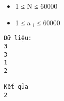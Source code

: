 \begin{itemize}
	\item     1 ≤ N ≤ 60000   
	\item     1 ≤ a    $_     i    $    ≤ 60000   
\end{itemize}
\begin{verbatim}
Dữ liệu:
3
3
1
2

Kết qủa
2
\end{verbatim}